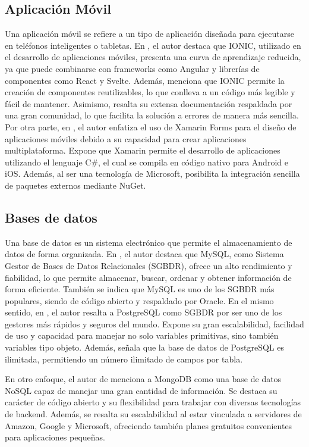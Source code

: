\subsection{Aplicación Móvil}
Una aplicación móvil se refiere a un tipo de aplicación diseñada para ejecutarse en teléfonos inteligentes o tabletas.
En \cite{chasichangoAplicacionMovilApoyo2022}, el autor destaca que IONIC, utilizado en el desarrollo de aplicaciones
móviles, presenta una curva de aprendizaje reducida, ya que puede combinarse con frameworks como Angular y librerías de
componentes como React y Svelte. Además, menciona que IONIC permite la creación de componentes reutilizables, lo que conlleva
a un código más legible y fácil de mantener. Asimismo, resalta su extensa documentación respaldada por una gran comunidad,
lo que facilita la solución a errores de manera más sencilla. Por otra parte, en \cite{lesanoperezAplicativoMovilGeoubicacion2022},
el autor enfatiza el uso de Xamarin Forms para el diseño de aplicaciones móviles debido a su capacidad para crear aplicaciones
multiplataforma. Expone que Xamarin permite el desarrollo de aplicaciones utilizando el lenguaje C\#, el cual se compila en
código nativo para Android e iOS. Además, al ser una tecnología de Microsoft, posibilita la integración sencilla de paquetes
externos mediante NuGet.

\subsection{Bases de datos}
Una base de datos es un sistema electrónico que permite el almacenamiento de datos de forma organizada.
En \cite{chicaizavillegasAplicacionWebPara2023}, el autor destaca que MySQL, como Sistema Gestor de Bases de Datos Relacionales
(SGBDR), ofrece un alto rendimiento y fiabilidad, lo que permite almacenar, buscar, ordenar y obtener información de forma eficiente.
También se indica que MySQL es uno de los SGBDR más populares, siendo de
código abierto y respaldado por Oracle. En el mismo sentido, en \cite{lesanoperezAplicativoMovilGeoubicacion2022}, el autor
resalta a PostgreSQL como SGBDR por ser uno de los gestores más rápidos y seguros del mundo. Expone su gran escalabilidad,
facilidad de uso y capacidad para manejar no solo variables primitivas, sino también variables tipo objeto. Además, señala que
la base de datos de PostgreSQL es ilimitada, permitiendo un número ilimitado de campos por tabla.

\bigbreak
En otro enfoque, el autor de \cite{chasichangoAplicacionMovilApoyo2022} menciona a MongoDB como una base de datos NoSQL capaz
de manejar una gran cantidad de información. Se destaca su carácter de código abierto y su flexibilidad para trabajar con
diversas tecnologías de backend. Además, se resalta su escalabilidad al estar vinculada a servidores de Amazon, Google y
Microsoft, ofreciendo también planes gratuitos convenientes para aplicaciones pequeñas.

